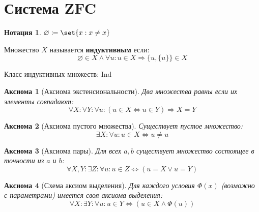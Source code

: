 \documentclass{article}
\newtheorem*{defnotation}{Нотация}
\newtheorem{axiom}{Аксиома}
\newcommand{\InductiveClass}{\mathrm{Ind}}
\begin{document}
\section{Система ZFC}
    \begin{defnotation}
        \(\varnothing \coloneq \set{x : x \ne x}\)
    \end{defnotation}
    \begin{definition}
        \label{def:inductive-class}
        Множество \(X\) называется \textbf{индуктивным} если:
        \[\varnothing \in X \land \forall u: u \in X \Rightarrow \{u, \{u\}\} \in X\]
        
        Класс индуктивных множеств: \(\InductiveClass\)
    \end{definition}

    \begin{axiom}[Аксиома экстенсиональности]
        Два множества равны если их элементы совпадают:
        \begin{equation}
            \label{ZFC-Ext}
            \forall X: \forall Y: \forall u: \left(u \in X \Leftrightarrow u \in Y \right) \Rightarrow X = Y \tag{Ext}
        \end{equation}
    \end{axiom}
    \begin{axiom}[Аксиома пустого множества]
        Существует пустое множество:
        \begin{equation}
            \label{ZFC-Empty}
            \exists X: \forall u: u \in X \Leftrightarrow u \ne u \tag{Empty}
        \end{equation}
    \end{axiom}
    \begin{axiom}[Аксиома пары]
        Для всех \(a, b\) существует множество состоящее в точности из \(a\) и \(b\):
        \begin{equation}
            \label{ZFC-Pair}
            \forall X,Y: \exists Z: \forall u: u \in Z \Leftrightarrow (u = X \lor  u = Y) \tag{Pair}
        \end{equation}
    \end{axiom}
    \begin{axiom}[Схема аксиом выделения]
        Для каждого условия \(\Phi(x)\) (возможно с параметрами) имеется своя аксиома выделения:
        \begin{equation}
            \label{ZFC-Sep}
            \forall X: \exists Y: \forall u: u \in Y \Leftrightarrow (u \in X \land \Phi(u)) \tag{Sep}
        \end{equation}
    \end{axiom}
\end{document}
